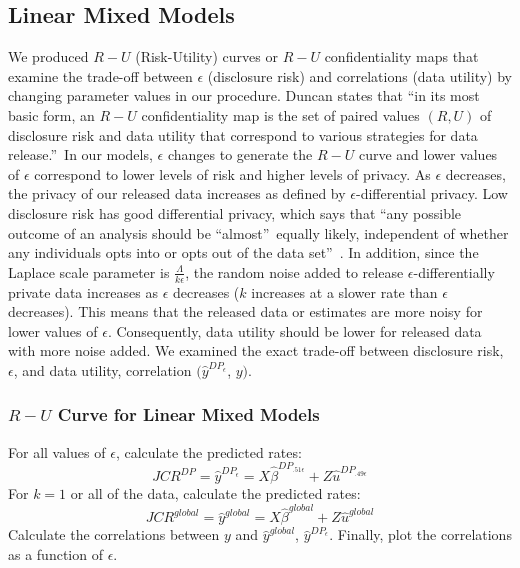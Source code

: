                       



\subsection{Linear Mixed Models}

We produced $R-U$ (Risk-Utility) curves or $R-U$ confidentiality maps that
examine the trade-off between $\epsilon $ (disclosure risk) and correlations
(data utility) by changing parameter values in our procedure. Duncan \cite%
{duncan} states that \textquotedblleft in its most basic form, an $R-U$
confidentiality map is the set of paired values $(R,U)$ of disclosure risk
and data utility that correspond to various strategies for data
release.\textquotedblright\ In our models, $\epsilon $ changes to generate
the $R-U$ curve and lower values of $\epsilon $ correspond to lower levels
of risk and higher levels of privacy. As $\epsilon $ decreases, the privacy
of our released data increases as defined by $\epsilon $-differential
privacy. Low disclosure risk has good differential privacy, which says that
\textquotedblleft any possible outcome of an analysis should be
\textquotedblleft almost\textquotedblright\ equally likely, independent of
whether any individuals opts into or opts out of the data
set\textquotedblright\ \cite{dwork}. In addition, since the Laplace scale
parameter is $\frac{\Lambda }{k\epsilon }$, the random noise added to
release $\epsilon $-differentially private data increases as $\epsilon $
decreases ($k$ increases at a slower rate than $\epsilon $ decreases). This
means that the released data or estimates are more noisy for lower values of 
$\epsilon $. Consequently, data utility should be lower for released data
with more noise added. We examined the exact trade-off between disclosure
risk, $\epsilon $, and data utility, correlation $(\hat{y}^{DP_{\epsilon }}$,%
$y)$.

\subsubsection{$R-U$ Curve for Linear Mixed Models}

{For all values of $\epsilon $, calculate the predicted rates: 
\begin{equation*}
JCR^{DP}=\hat{y}^{DP_{\epsilon }}=X\hat{\beta}^{DP_{.51\epsilon }}+Z\hat{u}%
^{DP_{.49\epsilon }} 
\end{equation*}%
For $k=1$ or all of the data, calculate the predicted rates: 
\begin{equation*}
JCR^{global}=\hat{y}^{global}=X\hat{\beta}^{global}+Z\hat{u}^{global} 
\end{equation*}%
Calculate the correlations between $y$ and $\hat{y}^{global}$, $\hat{y}%
^{DP_{\epsilon }}.$ Finally, plot the correlations as a function of $%
\epsilon $.}

